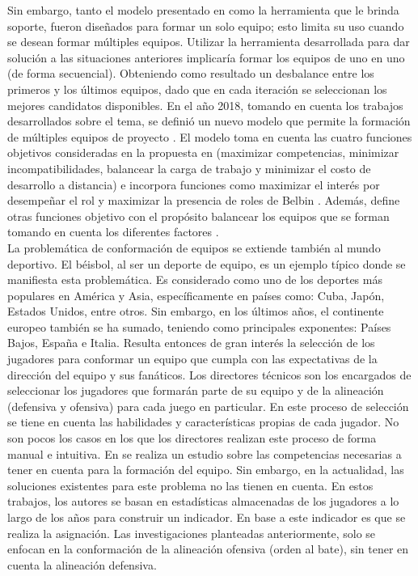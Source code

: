 Sin embargo, tanto el modelo presentado en \cite{Mayi09} como la herramienta que le brinda soporte, fueron diseñados para formar un solo equipo; esto limita su uso cuando se desean formar múltiples equipos. Utilizar la herramienta desarrollada para dar solución a las situaciones anteriores implicaría formar los equipos de uno en uno (de forma secuencial). Obteniendo como resultado un desbalance entre los primeros y los últimos equipos, dado que en cada iteración se seleccionan los mejores candidatos disponibles. En el año 2018, tomando en cuenta los trabajos desarrollados sobre el tema, se definió un nuevo modelo que permite la formación de múltiples equipos de proyecto \cite{Duran2019}. El modelo toma en cuenta las cuatro funciones objetivos consideradas en la propuesta en \cite{Mayi09} (maximizar competencias, minimizar incompatibilidades, balancear la carga de trabajo y minimizar el costo de desarrollo a distancia) e incorpora funciones como maximizar el interés por desempeñar el rol y maximizar la presencia de roles de Belbin \cite{Mayi09}. Además, define otras funciones objetivo con el propósito balancear los equipos que se forman tomando en cuenta los diferentes factores \cite{Duran2019}.\\

La problemática de conformación de equipos se extiende también al mundo deportivo. El béisbol, al ser un deporte de equipo, es un ejemplo típico donde se manifiesta esta problemática. Es considerado como uno de los deportes más populares en América y Asia, específicamente en países como: Cuba, Japón, Estados Unidos, entre otros. Sin embargo, en los últimos años, el continente europeo también se ha sumado, teniendo como principales exponentes: Países Bajos, España e Italia. Resulta entonces de gran interés la selección de los jugadores para conformar un equipo que cumpla con las expectativas de la dirección del equipo y sus fanáticos. Los directores técnicos son los encargados de seleccionar los jugadores que formarán parte de su equipo y de la alineación (defensiva y ofensiva) para cada juego en particular. En este proceso de selección se tiene en cuenta las habilidades y características propias de cada jugador. No son pocos los casos en los que los directores realizan este proceso de forma manual e intuitiva. En \cite{Smith1995} se realiza un estudio sobre las competencias necesarias a tener en cuenta para la formación del equipo. Sin embargo, en la actualidad, las soluciones existentes para este problema \cite{Polyashuk2015, Sugrue2007} no las tienen en cuenta. En estos trabajos, los autores se basan en estadísticas almacenadas de los jugadores a lo largo de los años para construir un indicador. En base a este indicador es que se realiza la asignación. Las investigaciones planteadas anteriormente, solo se enfocan en la conformación de la alineación ofensiva (orden al bate), sin tener en cuenta la alineación defensiva.  \\

